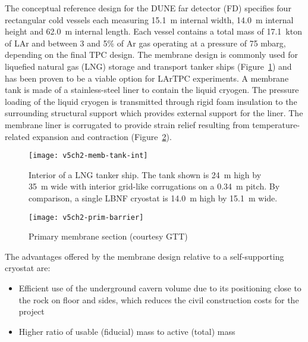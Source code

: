 The conceptual reference design for the DUNE far detector (FD) %
 specifies four   %
rectangular cold vessels each measuring 15.1~m internal width, 14.0~m internal 
height and 62.0~m internal length. Each vessel contains a total mass of 
17.1~kton of LAr and between 3 and 5\% of Ar gas operating at a 
pressure of 75 mbarg, depending on the final TPC design. The 
membrane design is commonly 
used for liquefied natural gas (LNG) storage and transport 
tanker ships (Figure~\ref{fig:memb-tank-int}) and has been 
proven to be a viable option for LArTPC experiments. 
A membrane tank 
is made of a stainless-steel liner to contain the liquid cryogen. 
The pressure loading of the liquid cryogen is transmitted 
through rigid foam insulation to the surrounding structural support 
which provides external support for the liner. The membrane 
liner is corrugated to provide strain relief resulting from 
temperature-related expansion and contraction (Figure~\ref{fig:prim-barrier}).

\begin{figure}[htbp]
\centering
\texttt{[image: v5ch2-memb-tank-int]}
\caption[Interior of a LNG tanker ship]{Interior of a LNG tanker ship. 
The tank shown is 24~m high by 35~m wide with interior grid-like 
corrugations on a 0.34~m pitch. By comparison, a single LBNF 
cryostat is %
14.0~m high by 15.1~m wide.}
\label{fig:memb-tank-int}
\end{figure}

\begin{figure}[htbp]
\centering
\texttt{[image: v5ch2-prim-barrier]}
\caption[Primary membrane section]{Primary membrane section (courtesy GTT)}
\label{fig:prim-barrier}
\end{figure}

The advantages offered by the membrane design relative to a self-supporting cryostat are:
\begin{itemize}
\item Efficient use of the underground cavern volume due to its positioning 
close to the rock on floor and sides, which reduces the civil construction 
costs for the project
\item Higher ratio of usable (fiducial) mass to active (total) mass
\end{itemize}

